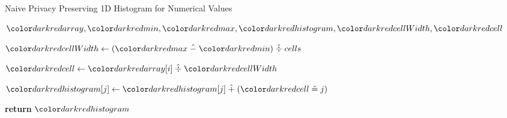 \begin{algorithm}[H]
\caption{Naive Privacy Preserving 1D Histogram for Numerical Values}\label{a:1d-simple-histogram-numerical}
\begin{algorithmic}[1]
\renewcommand{\algorithmicrequire}{\textbf{Private Vars:}}
\Require $\red{array}, \red{min}, \red{max}, \red{histogram}, \red{cellWidth}, \red{cell}$


    \State $\red{cellWidth} \gets (\red{max} \hminus \red{min}) \hdiv cells $


        \State $\red{cell} \gets \red{array}[i] \hdiv \red{cellWidth}$


            \State $\red{histogram}[j] \gets \red{histogram}[j] \hplus (\red{cell} \heq j)$

        \EndFor
    \EndFor
    \State \textbf{return} {$\red{histogram}$}
\EndProcedure
\end{algorithmic}
\end{algorithm}
